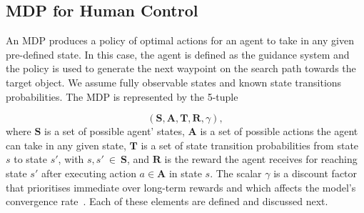 \documentclass[a4paper, twoside]{article}
\begin{document}


\subsection{MDP for Human Control}

\noindent An MDP produces a policy of optimal actions for an agent to take in any given pre-defined state. In this case, the agent is defined as the guidance system and the policy is used to generate the next waypoint on the search path towards the target object. We assume fully observable states and known state transitions probabilities. The MDP is represented by the 5-tuple

\begin{equation}
  (\mathbf{S}, \mathbf{A}, \mathbf{T}, \mathbf{R}, \gamma),
\end{equation}
where $\mathbf{S}$ is a set of possible agent' states, $\mathbf{A}$ is a set of possible actions the agent can take in any given state, $\mathbf{T}$ is a set of state transition probabilities from state $s$ to state $s'$, with ${s,s'~\in~\mathbf{S}}$, and $\mathbf{R}$ is the reward the agent receives for reaching state $s'$ after executing action $a \in \mathbf{A}$ in state $s$. The scalar $\gamma$ is a discount factor that prioritises immediate over long-term rewards and which affects the model's convergence rate~\cite{Russell2009}. Each of these elements are defined and discussed next.
\end{document}
